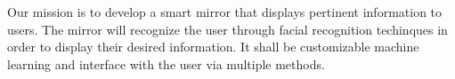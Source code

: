 Our mission is to develop a smart mirror that displays pertinent information to users. The mirror will recognize the user through facial recognition techinques in order to display their desired information. It shall be customizable machine learning and interface with the user via multiple methods.